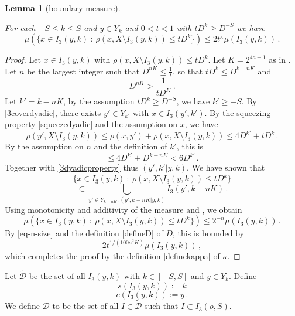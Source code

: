 \documentclass[10pt,a4paper]{article}
\theoremstyle{plain}
\newtheorem{lemma}[theorem]{Lemma}
\theoremstyle{definition}
\numberwithin{equation}{subsection}
\newcommand{\lean}[1]{}
\newcommand{\uses}[1]{}
\newcommand{\leanok}{}
\begin{document}
\begin{lemma}[boundary measure]
    \label{boundary-measure}
    \uses{smaller-boundary}
    \leanok
    \lean{boundary_measure}
    For each $-S\le k\le S$ and $y\in Y_k$ and $0<t<1$
    with $tD^k\ge D^{-S}$ we have
    \begin{equation}
        \label{old-small-boundary}
        \mu(\{x \in I_3(y,k) \ : \ \rho(x, X \setminus I_3(y,k)) \leq t D^{k}\}) \le 2 t^\kappa \mu(I_3(y,k))\,.
    \end{equation}
\end{lemma}
\begin{proof}
\leanok
Let $x\in I_3(y,k)$ with $\rho(x, X \setminus I_3(y,k)) \leq t D^{k}$. Let $K = 2^{4a+1}$ as in .
Let $n$ be the largest integer such that
$D^{nK} \le \frac{1}{t}$, so that $tD^k \le D^{k-nK}$ and
\begin{equation}
\label{eq-n-size}
    D^{nK} > \frac{1}{tD^K}\,.
\end{equation}
Let $k' = k - nK$, by the assumption $tD^k \ge D^{-S}$, we have $k' \ge -S$. By \eqref{3coverdyadic}, there exists $y' \in Y_{k'}$ with $x \in I_3(y',k')$. By the squeezing property \eqref{squeezedyadic} and the assumption on $x$, we have
$$
    \rho(y', X \setminus I_3(y,k)) \le \rho(x,y') + \rho(x, X \setminus I_3(y,k)) \le 4 D^{k'} + t D^{k}\,.
$$
By the assumption on $n$ and the definition of $k'$, this is
$$
    \le 4D^{k'} + D^{k - nK} < 6D^{k'}\,.
$$
Together with \eqref{3dyadicproperty} thus $(y',k'|y,k)$. We have shown that
$$
    \{x \in I_3(y,k) \ : \ \rho(x, X \setminus I_3(y,k)) \leq t D^{k}\}
$$
$$
    \subset \bigcup_{y'\in Y_{k-nK}: (y',k-nK|y,k)}I_3(y',k-nK)\,.
$$
Using monotonicity and additivity of the measure and , we obtain
$$
    \mu(\{x \in I_3(y,k) \ : \ \rho(x, X \setminus I_3(y,k)) \leq t D^{k}\}) \le 2^{-n} \mu(I_3(y,k))\,.
$$
By \eqref{eq-n-size} and the definition \eqref{defineD} of $D$, this is bounded by
$$
    2 t^{1/(100a^2 K)}  \mu(I_3(y,k))\,,
$$
which completes the proof by the definition \eqref{definekappa} of $\kappa$.
\end{proof}

Let $\tilde{\mathcal{D}}$ be the set of all $I_3(y,k)$ with $k\in [-S,S]$ and
$y\in Y_k$. Define
\begin{equation}
s(I_3(y,k)):=k
\end{equation}
\begin{equation}
c(I_3(y,k)):=y\,.
\end{equation}
We define $\mathcal{D}$ to be the set of all $I \in \tilde{\mathcal{D}}$ such that $I \subset I_3(o, S)$.
\end{document}
